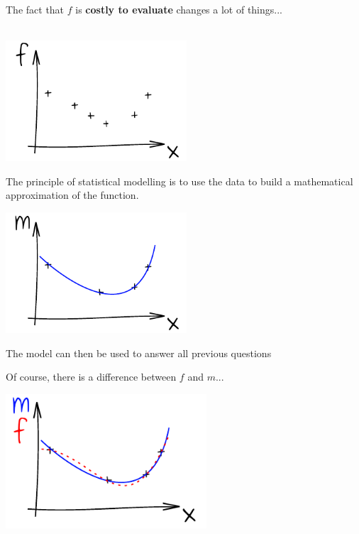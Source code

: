 \begin{frame}{}
The fact that $f$ is \textbf{costly to evaluate} changes a lot of things...\\
\vspace{5mm}
\\
\vspace{5mm}
\begin{center}
\includegraphics[height=4.5cm]{1_stat_models/figures/ink_fX}
\end{center}
\end{frame}

\begin{frame}{}
The principle of statistical modelling is to use the data to build a mathematical approximation of the function.
\begin{center}
\includegraphics[height=4.5cm]{1_stat_models/figures/ink_m}
\end{center}
The model can then be used to answer all previous questions
\end{frame}

\begin{frame}{}
Of course, there is a difference between $f$ and $m$...
\begin{center}
\includegraphics[height=5cm]{1_stat_models/figures/ink_mf}
\end{center}
\end{frame}

